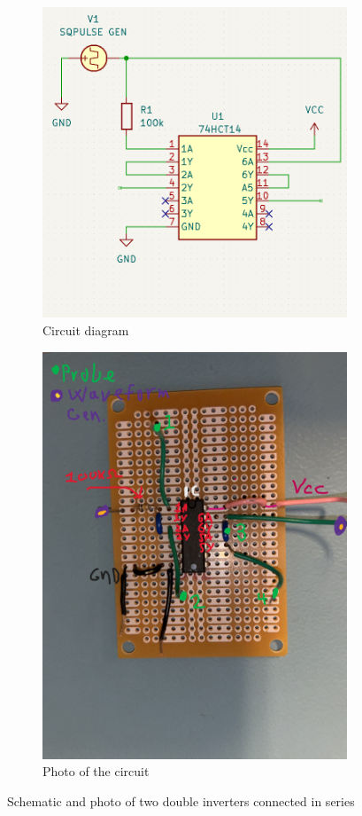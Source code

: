 \documentclass[onecolumn]{article}
\begin{document}
\begin{figure}[h!]
    \centering
    \begin{subfigure}{.5\textwidth}
      \centering
      \includegraphics[width=.78\linewidth]{Task 1 Circuit.png}
      \caption{Circuit diagram}
      \label{fig:sub1}
    \end{subfigure}%
    \begin{subfigure}{.5\textwidth}
      \centering
      \includegraphics[width=.6\linewidth]{Photo of circuit 2.jpg}
      \caption{Photo of the circuit}
      \label{fig:sub2}
    \end{subfigure}
    \caption{Schematic and photo of two double inverters connected in series}
    \label{fig:1}
\end{figure}
\end{document}
